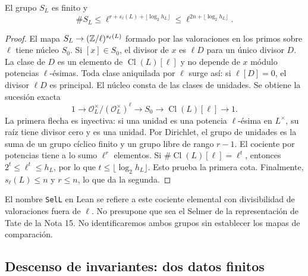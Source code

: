 \begin{proposicion}
\label{prop:cu-sl}
El grupo $S_L$ es finito y
\begin{equation}
 \#S_L\le\ell^{r+s_\ell(L)+\lfloor\log_2h_L\rfloor}
 \le\ell^{2n+\lfloor\log_2h_L\rfloor}.
 \label{eq:cu-sl}
\end{equation}
\end{proposicion}
\begin{proof}
El mapa $S_L\to(\mathbb{Z}/\ell)^{s_\ell(L)}$ formado por las valoraciones en los primos sobre $\ell$ tiene núcleo $S_0$. Si $[x]\in S_0$, el divisor de $x$ es $\ell D$ para un único divisor $D$. La clase de $D$ es un elemento de $\operatorname{Cl}(L)[\ell]$ y no depende de $x$ módulo potencias $\ell$-ésimas. Toda clase aniquilada por $\ell$ surge así: si $\ell[D]=0$, el divisor $\ell D$ es principal. El núcleo consta de las clases de unidades. Se obtiene la sucesión exacta
\begin{equation}
 1\longrightarrow \mathcal O_L^\times/(\mathcal O_L^\times)^\ell
 \longrightarrow S_0\longrightarrow\operatorname{Cl}(L)[\ell]
 \longrightarrow1.
 \label{eq:cu-sl-exacta}
\end{equation}
La primera flecha es inyectiva: si una unidad es una potencia $\ell$-ésima en $L^\times$, su raíz tiene divisor cero y es una unidad. Por Dirichlet, el grupo de unidades es la suma de un grupo cíclico finito y un grupo libre de rango $r-1$. El cociente por potencias tiene a lo sumo $\ell^r$ elementos. Si $\#\operatorname{Cl}(L)[\ell]=\ell^t$, entonces $2^t\le\ell^t\le h_L$, por lo que $t\le\lfloor\log_2h_L\rfloor$. Esto prueba la primera cota. Finalmente, $s_\ell(L)\le n$ y $r\le n$, lo que da la segunda.
\end{proof}

El nombre \texttt{SelL} en Lean se refiere a este cociente elemental con divisibilidad de valoraciones fuera de $\ell$. No presupone que sea el Selmer de la representación de Tate de la Nota 15. No identificaremos ambos grupos sin establecer los mapas de comparación.

\subsection{Descenso de invariantes: dos datos finitos}

